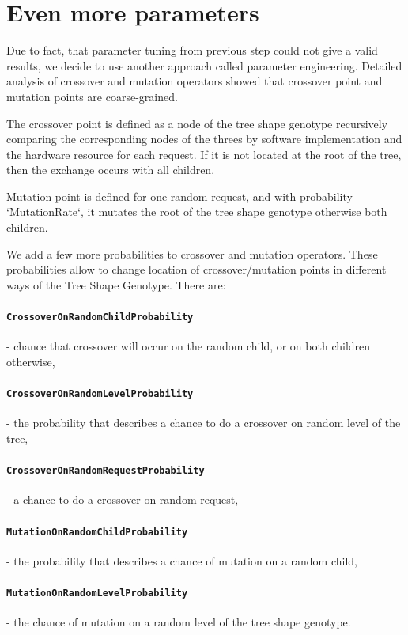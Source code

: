 \section{Even more parameters}

Due to fact, that parameter tuning from previous step could not give a valid results, we decide to use another approach called parameter engineering.
Detailed analysis of crossover and mutation operators showed that crossover point and mutation points are coarse-grained.

The crossover point is defined as a node of the tree shape genotype recursively comparing the corresponding nodes of the threes by software implementation and the hardware resource for each request.
If it is not located at the root of the tree, then the exchange occurs with all children.

Mutation point is defined for one random request, and with probability `MutationRate`, it mutates the root of the tree shape genotype otherwise both children.

We add a few more probabilities to crossover and mutation operators. These probabilities allow to change location of crossover/mutation points in different ways of the Tree Shape Genotype.
There are:
	\paragraph{\texttt{CrossoverOnRandomChildProbability}} - chance that crossover will occur on the random child, or on both children otherwise,
	\paragraph{\texttt{CrossoverOnRandomLevelProbability}} - the probability that describes a chance to do a crossover on random level of the tree, 
	\paragraph{\texttt{CrossoverOnRandomRequestProbability}} - a chance to do a crossover on random request,
	\paragraph{\texttt{MutationOnRandomChildProbability}} - the probability that describes a chance of mutation on a random child,
	\paragraph{\texttt{MutationOnRandomLevelProbability}} - the chance of mutation on a random level of the tree shape genotype.

